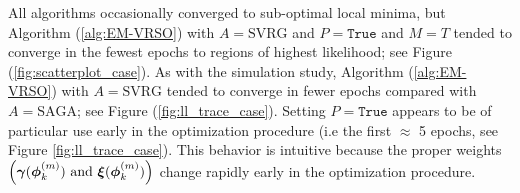 %
All algorithms occasionally converged to sub-optimal local minima, but Algorithm (\ref{alg:EM-VRSO}) with $A = \text{SVRG}$ and $P=\texttt{True}$ and $M=T$ tended to converge in the fewest epochs to regions of highest likelihood; see Figure (\ref{fig:scatterplot_case}). As with the simulation study, Algorithm (\ref{alg:EM-VRSO}) with $A = \text{SVRG}$ tended to converge in fewer epochs compared with $A=\text{SAGA}$; see Figure (\ref{fig:ll_trace_case}). Setting $P = \texttt{True}$ appears to be of particular use early in the optimization procedure (i.e the first $\approx$ 5 epochs, see Figure \ref{fig:ll_trace_case}). This behavior is intuitive because the proper weights $\left(\boldsymbol{\gamma}(\boldsymbol{\phi}_k^{(m)}) ~ \text{and} ~ \boldsymbol{\xi}(\boldsymbol{\phi}_k^{(m)})\right)$ change rapidly early in the optimization procedure. 


%
%


